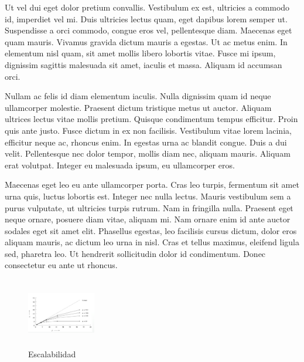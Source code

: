 \documentclass[10pt,twocolumn,a4paper]{article}
\begin{document}
Ut vel dui eget dolor pretium convallis. Vestibulum ex est, ultricies a commodo id, imperdiet vel mi. Duis ultricies lectus quam, eget dapibus lorem semper ut. Suspendisse a orci commodo, congue eros vel, pellentesque diam. Maecenas eget quam mauris. Vivamus gravida dictum mauris a egestas. Ut ac metus enim. In elementum nisl quam, sit amet mollis libero lobortis vitae. Fusce mi ipsum, dignissim sagittis malesuada sit amet, iaculis et massa. Aliquam id accumsan orci.

Nullam ac felis id diam elementum iaculis. Nulla dignissim quam id neque ullamcorper molestie. Praesent dictum tristique metus ut auctor. Aliquam ultrices lectus vitae mollis pretium. Quisque condimentum tempus efficitur. Proin quis ante justo. Fusce dictum in ex non facilisis. Vestibulum vitae lorem lacinia, efficitur neque ac, rhoncus enim. In egestas urna ac blandit congue. Duis a dui velit. Pellentesque nec dolor tempor, mollis diam nec, aliquam mauris. Aliquam erat volutpat. Integer eu malesuada ipsum, eu ullamcorper eros.

Maecenas eget leo eu ante ullamcorper porta. Cras leo turpis, fermentum sit amet urna quis, luctus lobortis est. Integer nec nulla lectus. Mauris vestibulum sem a purus vulputate, ut ultricies turpis rutrum. Nam in fringilla nulla. Praesent eget neque ornare, posuere diam vitae, aliquam mi. Nam ornare enim id ante auctor sodales eget sit amet elit. Phasellus egestas, leo facilisis cursus dictum, dolor eros aliquam mauris, ac dictum leo urna in nisl. Cras et tellus maximus, eleifend ligula sed, pharetra leo. Ut hendrerit sollicitudin dolor id condimentum. Donec consectetur eu ante ut rhoncus.

\begin{figure}[H]
\begin{center}
\includegraphics[height=3cm, width=3cm]{grafico}
\caption{Escalabilidad}
\end{center}
\end{figure}
\end{document}
